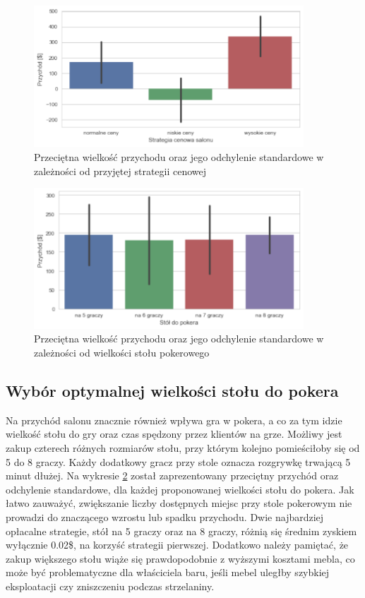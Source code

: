 \documentclass[12pt, a4paper, oneside]{mwart} %
\begin{document}
\begin{figure}
\centering
\caption{Przeciętna wielkość przychodu oraz jego odchylenie standardowe w zależności od przyjętej strategii cenowej}
\label{wyk_drinki}
\includegraphics[width = 0.9\textwidth]{wykresy/drinki.pdf}
\end{figure}

\begin{figure}
\centering
\caption{Przeciętna wielkość przychodu oraz jego odchylenie standardowe w zależności od wielkości stołu pokerowego}
\label{wyk_poker}
\includegraphics[width = 0.9\textwidth]{wykresy/poker.pdf}
\end{figure}

\subsection{Wybór optymalnej wielkości stołu do pokera}
Na przychód salonu znacznie również wpływa gra w pokera, a co za tym idzie wielkość stołu do gry oraz czas spędzony przez klientów na grze. Możliwy jest zakup czterech różnych rozmiarów stołu, przy którym kolejno pomieściłoby się od 5 do 8 graczy. Każdy dodatkowy gracz przy stole oznacza rozgrywkę trwającą 5 minut dłużej. Na wykresie \ref{wyk_poker} został zaprezentowany przeciętny przychód oraz odchylenie standardowe, dla każdej proponowanej wielkości stołu do pokera. Jak łatwo zauważyć, zwiększanie liczby dostępnych miejsc przy stole pokerowym nie prowadzi do znaczącego wzrostu lub spadku przychodu. Dwie najbardziej opłacalne strategie, stół na 5 graczy oraz na 8 graczy, różnią się średnim zyskiem wyłącznie 0.02\$, na korzyść strategii pierwszej. Dodatkowo należy pamiętać, że zakup większego stołu wiąże się prawdopodobnie z wyższymi kosztami mebla, co może być problematyczne dla właściciela baru, jeśli mebel uległby szybkiej eksploatacji czy zniszczeniu podczas strzelaniny.
\end{document}

